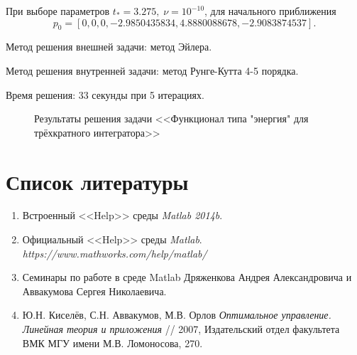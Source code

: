 \documentclass{article}
\begin{document}
\noindent При выборе параметров $t_* = 3.275, \; \nu = 10^{-10}$, для начального приближения 
$$
p_0 = [0, 0, 0, -2.9850435834, 4.8880088678, -2.9083874537].
$$

Метод решения внешней задачи: метод Эйлера.

Метод решения внутренней задачи: метод Рунге-Кутта 4-5 порядка.

Время решения: 33 секунды при 5 итерациях.

\begin{figure}[!h]
\caption{Результаты решения задачи <<Функционал типа "энергия" для трёхкратного интегратора>>}\label{ris:task3}
\end{figure}

\newpage

\section{Список литературы}

\begin{enumerate}
    \item Встроенный <<Help>> среды \textit{Matlab 2014b}.
    \item Официальный <<Help>> среды \textit{Matlab}.  \\
    \emph{https://www.mathworks.com/help/matlab/}
    \item Семинары по работе в среде Matlab Дряженкова Андрея Александровича и Аввакумова Сергея Николаевича.
    \item Ю.Н. Киселёв, С.Н. Аввакумов, М.В. Орлов \emph{Оптимальное управление. Линейная теория и приложения} // 2007, Издательский отдел факультета ВМК МГУ имени М.В. Ломоносова, 270.
\end{enumerate}
\end{document}
